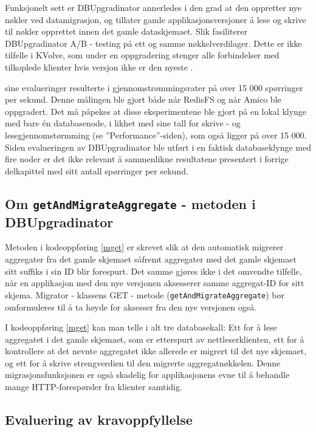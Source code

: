 Funksjonelt sett er DBUpgradinator annerledes i den grad at den oppretter nye nøkler ved datamigrasjon, og tillater gamle applikasjonsversjoner å lese og skrive til nøkler opprettet innen det gamle dataskjemaet. Slik fasiliterer DBUpgradinator A/B - testing på ett og samme nøkkelverdi\-lager. Dette er ikke tilfelle i KVolve, som under en oppgradering stenger alle forbindelser med tilkoplede klienter hvis versjon ikke er den nyeste \citep[p.~5]{saur2016}.

\cite{saur2016} sine evalueringer resulterte i gjennomstrømmingsrater på over 15 000 spørringer per sekund. Denne målingen ble gjort både når RedisFS og når Amico ble oppgradert. Det må påpekes at disse eksperimentene ble gjort på en lokal klynge med bare én databasenode, i likhet med \cite{kreps2009} sine tall for skrive - og lesegjennomstørmming (se ''Performance''-siden), som også ligger på over 15 000. Siden evalueringen av DBUpgradinator ble utført i en faktisk databaseklynge med fire noder er det ikke relevant å sammenlikne resultatene presentert i forrige delkapittel med \cite[p.~8]{saur2016} sitt antall spørringer per sekund.

\subsection{Om \texttt{getAndMigrateAggregate} - metoden i DBUpgradinator}

Metoden i kodeoppføring \ref{mget} er skrevet slik at den automatisk migrerer aggregater fra det gamle skjemaet såfremt aggregater med det gamle skjemaet sitt suffiks i sin ID blir forespurt. Det samme gjøres ikke i det omvendte tilfelle, når en applikasjon med den nye versjonen aksesserer samme aggregat-ID for sitt skjema. Migrator - klassens GET - metode (\texttt{getAndMigrateAggregate}) bør omformuleres til å ta høyde for aksesser fra den nye versjonen også.

I kodeoppføring \ref{mget} kan man telle i alt tre databasekall: Ett for å lese aggregatet i det gamle skjemaet, som er etterspurt av nettleserklienten, ett for å kontrollere at det nevnte aggregatet ikke allerede er migrert til det nye skjemaet, og ett for å skrive strengverdien til den migrerte aggregatnøkkelen. Denne migrasjonsfunksjonen er også skadelig for applikasjonens evne til å behandle mange HTTP-forespørsler fra klienter samtidig.

\subsection{Evaluering av kravoppfyllelse}

